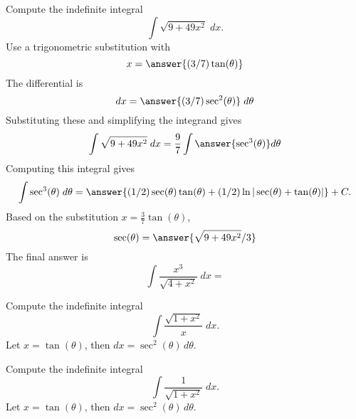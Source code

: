 \documentclass{ximera}
\begin{document}
\begin{problem}
Compute the indefinite integral
\[
\int \sqrt{9 + 49x^2} \; dx.
\]
Use a trigonometric substitution with\\
\[
x = \answer{(3/7)\tan(\theta)}
\]
The differential is\\
\[
dx = \answer{(3/7)\sec^2(\theta)} \; d\theta
\]
Substituting these and simplifying the integrand gives\\
\[
\int \sqrt{9 + 49x^2} \; dx = \frac97 \int \answer{\sec^3(\theta)} d\theta
\]
Computing this integral gives
\[
\int \sec^3(\theta) \; d\theta = \answer{(1/2)\sec(\theta) \tan(\theta) + (1/2)\ln|\sec(\theta)+\tan(\theta)|} + C.
\]
Based on the substitution $x = \frac37 \tan(\theta)$, \\
\[
\sec(\theta) = \answer{\sqrt{9+49x^2}/3}
\]
The final answer is
\[
\int  \frac{x^3}{\sqrt{4 + x^2}} \; dx = 
\]
\begin{center}
\begin{multipleChoice}
\end{multipleChoice}
\end{center}
\end{problem}






\begin{example}
Compute the indefinite integral
\[
\int\frac{\sqrt{1+x^2}}{x}\; dx.
\]
Let $x = \tan(\theta)$, then $dx = \sec^2(\theta) \, d\theta$.
\end{example}

\begin{example}
Compute the indefinite integral
\[
\int\frac{1}{\sqrt{1+x^2}}\; dx.
\]
Let $x = \tan(\theta)$, then $dx = \sec^2(\theta) \, d\theta$.
\end{example}





\begin{center}
\begin{foldable}
\end{foldable}
\end{center}
\end{document}
